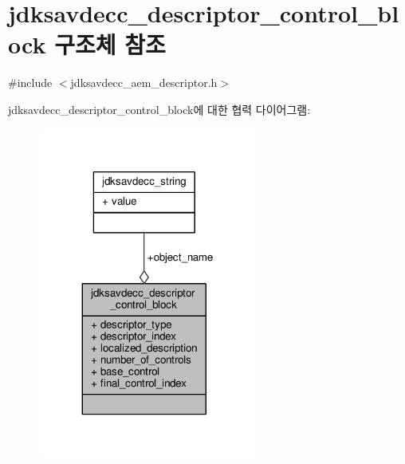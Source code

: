 \hypertarget{structjdksavdecc__descriptor__control__block}{}\section{jdksavdecc\+\_\+descriptor\+\_\+control\+\_\+block 구조체 참조}
\label{structjdksavdecc__descriptor__control__block}


{\ttfamily \#include $<$jdksavdecc\+\_\+aem\+\_\+descriptor.\+h$>$}



jdksavdecc\+\_\+descriptor\+\_\+control\+\_\+block에 대한 협력 다이어그램\+:
\nopagebreak
\begin{figure}[H]
\begin{center}
\leavevmode
\includegraphics[width=203pt]{structjdksavdecc__descriptor__control__block__coll__graph}
\end{center}
\end{figure}
